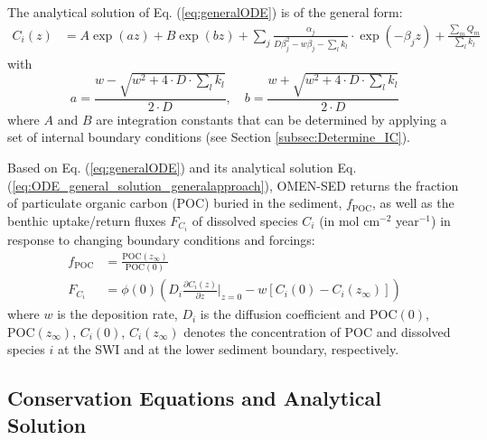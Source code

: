 \documentclass[gmd, manuscript]{copernicus}
\begin{document}
The analytical solution of Eq. (\ref{eq:generalODE}) is of the general form:
\begin{align}
 C_i(z) &= A \exp(az) + B  \exp(bz) + \sum_j \frac{\alpha_j}{D \beta_j^2-w\beta_j- \sum_l k_l}\cdot \exp(-\beta_j z) + \frac{\sum_m Q_m}{\sum_l k_l} \label{eq:ODE_general_solution_generalapproach}
\end{align}
with 
\begin{equation} 
 a = \frac{w - \sqrt{w^2+4\cdot D\cdot \sum_l k_l}}{2\cdot D}, \quad b = \frac{w + \sqrt{w^2+4\cdot D\cdot \sum_l k_l}}{2\cdot D}
\end{equation}
where $A$ and $B$ are integration constants that can be determined by applying a set of internal boundary conditions (see Section \ref{subsec:Determine_IC}).

Based on Eq. (\ref{eq:generalODE}) and its analytical solution Eq. (\ref{eq:ODE_general_solution_generalapproach}), OMEN-SED returns the fraction of particulate organic carbon (POC) buried in the sediment, 
$f_{\mathrm{POC}}$, as well as the benthic uptake/return fluxes $F_{C_i}$ of dissolved species $C_i$ (in mol cm$^{-2}$ year$^{-1}$) in response to changing boundary conditions and forcings:
\begin{align}
f_{\mathrm{POC}} &= \frac{\mathrm{POC}(z_\infty)}{\mathrm{POC}(0)} \\
F_{C_i} &= \phi(0) \left(D_i \frac{\partial C_i(z)}{\partial z}\bigg\rvert_{z=0} - w \left[ C_i(0) - C_i(z_\infty) \right]\right)
\end{align}
where $w$ is the deposition rate, $D_i$ is the diffusion coefficient and $\mathrm{POC}(0)$, $\mathrm{POC}(z_\infty)$, $C_i(0)$, $C_i(z_\infty)$ denotes the concentration of POC and dissolved species $i$ at the SWI and 
at the lower sediment boundary, respectively.


\subsection{Conservation Equations and Analytical Solution}\label{subsec:ReactionNetwork}
\end{document}
